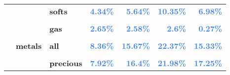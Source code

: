 \documentclass[
  authoryear,
  preprint,
  3p]{elsarticle}
\begin{document}
\begin{longtable}[t]{>{}l>{}l>{}l>{}r>{}r>{}r>{}r}
\addlinespace
\textbf{} & \textbf{} & \textbf{softs} & \textcolor[HTML]{4285f4}{\textbf{4.34\%}} & \textcolor[HTML]{4285f4}{\textbf{5.64\%}} & \textcolor[HTML]{4285f4}{\textbf{10.35\%}} & \textcolor[HTML]{4285f4}{\textbf{6.98\%}}\\
\textbf{\cellcolor{gray!10}{}} & \textbf{\cellcolor{gray!10}{energy}} & \textbf{\cellcolor{gray!10}{all}} & \textcolor[HTML]{4285f4}{\textbf{\cellcolor{gray!10}{3.35\%}}} & \textcolor[HTML]{4285f4}{\textbf{\cellcolor{gray!10}{6.27\%}}} & \textcolor[HTML]{4285f4}{\textbf{\cellcolor{gray!10}{14.83\%}}} & \textcolor[HTML]{4285f4}{\textbf{\cellcolor{gray!10}{2.45\%}}}\\
\textbf{} & \textbf{} & \textbf{gas} & \textcolor[HTML]{4285f4}{\textbf{2.65\%}} & \textcolor[HTML]{4285f4}{\textbf{2.58\%}} & \textcolor[HTML]{4285f4}{\textbf{2.6\%}} & \textcolor[HTML]{4285f4}{\textbf{0.27\%}}\\
\textbf{\cellcolor{gray!10}{}} & \textbf{\cellcolor{gray!10}{}} & \textbf{\cellcolor{gray!10}{petroleum}} & \textcolor[HTML]{4285f4}{\textbf{\cellcolor{gray!10}{3.59\%}}} & \textcolor[HTML]{4285f4}{\textbf{\cellcolor{gray!10}{7.49\%}}} & \textcolor[HTML]{4285f4}{\textbf{\cellcolor{gray!10}{18.9\%}}} & \textcolor[HTML]{4285f4}{\textbf{\cellcolor{gray!10}{3.17\%}}}\\
\textbf{} & \textbf{metals} & \textbf{all} & \textcolor[HTML]{4285f4}{\textbf{8.36\%}} & \textcolor[HTML]{4285f4}{\textbf{15.67\%}} & \textcolor[HTML]{4285f4}{\textbf{22.37\%}} & \textcolor[HTML]{4285f4}{\textbf{15.33\%}}\\
\addlinespace
\textbf{\cellcolor{gray!10}{}} & \textbf{\cellcolor{gray!10}{}} & \textbf{\cellcolor{gray!10}{base}} & \textcolor[HTML]{4285f4}{\textbf{\cellcolor{gray!10}{10.12\%}}} & \textcolor[HTML]{4285f4}{\textbf{\cellcolor{gray!10}{12.74\%}}} & \textcolor[HTML]{4285f4}{\textbf{\cellcolor{gray!10}{23.94\%}}} & \textcolor[HTML]{4285f4}{\textbf{\cellcolor{gray!10}{7.67\%}}}\\
\textbf{} & \textbf{} & \textbf{precious} & \textcolor[HTML]{4285f4}{\textbf{7.92\%}} & \textcolor[HTML]{4285f4}{\textbf{16.4\%}} & \textcolor[HTML]{4285f4}{\textbf{21.98\%}} & \textcolor[HTML]{4285f4}{\textbf{17.25\%}}\\
\bottomrule

\end{longtable}

\endgroup{}

\newpage

\begingroup\fontsize{7}{9}\selectfont
\end{document}

